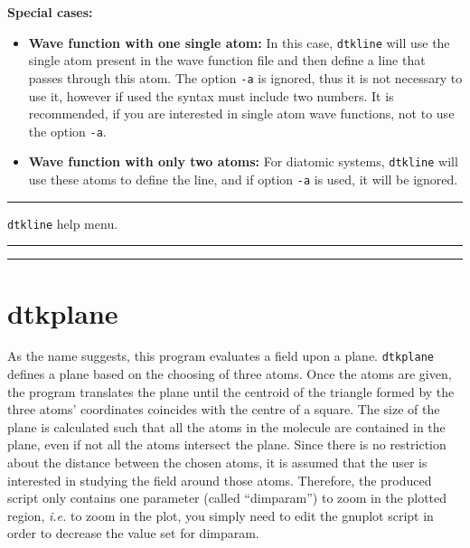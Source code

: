 \textbf{Special cases:}
\begin{itemize}
   \item \textbf{Wave function with one single atom:} In this case, \texttt{dtkline} will use the single atom present in the wave function file and then define a line that passes through this atom. The option \texttt{-a} is ignored, thus it is not necessary to use it, however if used the syntax must include two numbers. It is recommended, if you are interested in single atom wave functions, not to use the option \texttt{-a}.
   \item \textbf{Wave function with only two atoms:} For diatomic systems, \texttt{dtkline} will use these atoms to define the line, and if option \texttt{-a} is used, it will be ignored. 
\end{itemize}

\rule{\textwidth}{1pt}
{\center\texttt{dtkline} help menu.\\}
\rule{\textwidth}{1pt}
\begin{footnotesize}
\end{footnotesize}
\rule{\textwidth}{1pt}

\section{dtkplane}

As the name suggests, this program evaluates a field upon a plane. \texttt{dtkplane}
defines a plane based on the choosing of three atoms. Once the atoms are given,
the program translates the plane until the centroid of the triangle formed by the
three atoms' coordinates coincides with the centre of a square. The size of the
plane is calculated such that all the atoms in the molecule are contained in
the plane, even if not all the atoms intersect the plane. Since there is no
restriction about the distance between the chosen atoms, it is assumed that
the user is interested in studying the field around those atoms. Therefore,
the produced script only contains one parameter (called ``dimparam'') to zoom in
the plotted region, \textit{i.e.} to zoom in the plot, you simply need to edit
the gnuplot script in order to decrease the value set for dimparam.

